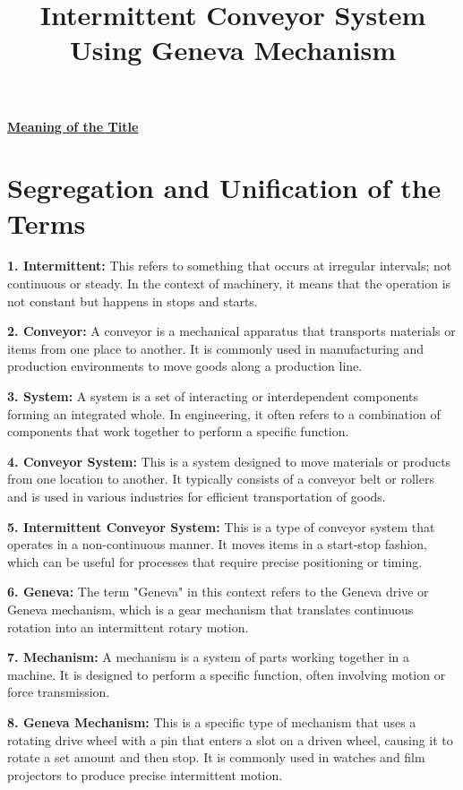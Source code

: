 \documentclass[a4paper,12pt]{article}
\title{Intermittent Conveyor System Using Geneva Mechanism}
\author{}
\date{}
\begin{document}
\pagecolor{questionPapers}

\maketitle
\begin{center}
    \textbf{\underline{Meaning of the Title}}
\end{center}

\section*{Segregation and Unification of the Terms}

\textbf{1. Intermittent:} This refers to something that occurs at irregular intervals; not continuous or steady. In the context of machinery, it means that the operation is not constant but happens in stops and starts.

\textbf{2. Conveyor:} A conveyor is a mechanical apparatus that transports materials or items from one place to another. It is commonly used in manufacturing and production environments to move goods along a production line.

\textbf{3. System:} A system is a set of interacting or interdependent components forming an integrated whole. In engineering, it often refers to a combination of components that work together to perform a specific function.

\textbf{4. Conveyor System:} This is a system designed to move materials or products from one location to another. It typically consists of a conveyor belt or rollers and is used in various industries for efficient transportation of goods.

\textbf{5. Intermittent Conveyor System:} This is a type of conveyor system that operates in a non-continuous manner. It moves items in a start-stop fashion, which can be useful for processes that require precise positioning or timing.

\textbf{6. Geneva:} The term "Geneva" in this context refers to the Geneva drive or Geneva mechanism, which is a gear mechanism that translates continuous rotation into an intermittent rotary motion.

\textbf{7. Mechanism:} A mechanism is a system of parts working together in a machine. It is designed to perform a specific function, often involving motion or force transmission.

\textbf{8. Geneva Mechanism:} This is a specific type of mechanism that uses a rotating drive wheel with a pin that enters a slot on a driven wheel, causing it to rotate a set amount and then stop. It is commonly used in watches and film projectors to produce precise intermittent motion.
\end{document}
